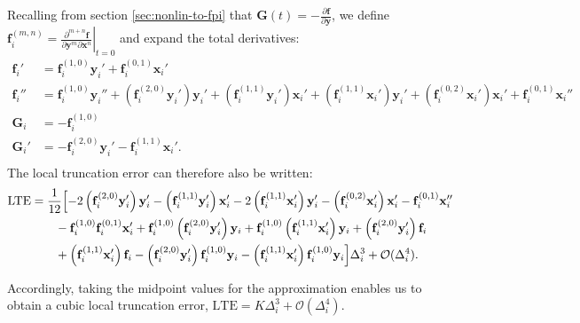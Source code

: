 Recalling from section \ref{sec:nonlin-to-fpi} that $\mathbf{G}(t) = -\frac{\partial \mathbf{f}}{\partial \mathbf{y}}$, we define $\mathbf{f}_i^{(m,n)} = \left.\frac{\partial ^{m+n}\mathbf{f}}{\partial \mathbf{y}^m \partial \mathbf{x}^n}\right|_{t=0}$ and expand the total derivatives:
\begin{equation}
\begin{split}
    \mathbf{f}_i' & = \mathbf{f}_i^{(1,0)}\mathbf{y}_i'+\mathbf{f}_i^{(0,1)}\mathbf{x}_i'\\
    \mathbf{f}_i'' & = \mathbf{f}_i^{(1,0)}\mathbf{y}_i'' + \left(\mathbf{f}_i^{(2,0)}\mathbf{y}_i'\right)\mathbf{y}_i'  + \left(\mathbf{f}_i^{(1,1)}\mathbf{y}_i'\right)\mathbf{x}_i' + \left(\mathbf{f}_i^{(1,1)}\mathbf{x}_i'\right)\mathbf{y}_i' + \left(\mathbf{f}_i^{(0,2)}\mathbf{x}_i'\right)\mathbf{x}_i' + \mathbf{f}_i^{(0,1)}\mathbf{x}_i''\\
    \mathbf{G}_i & = -\mathbf{f}_i^{(1,0)} \\
    \mathbf{G}_i' & =  - \mathbf{f}_i^{(2,0)}\mathbf{y}_i' - \mathbf{f}_i^{(1,1)}\mathbf{x}_i'.\\
\end{split}
\end{equation}
The local truncation error can therefore also be written:
\begin{equation}
\begin{split}
    \textrm{LTE} & = \frac{1}{12}\Bigl[-2\left(\mathbf{f}_i^{(2,0)}\mathbf{y}_i'\right)\mathbf{y}_i' - \left(\mathbf{f}_i^{(1,1)}\mathbf{y}_i'\right)\mathbf{x}_i' - 2\left(\mathbf{f}_i^{(1,1)}\mathbf{x}_i'\right)\mathbf{y}_i' - \left(\mathbf{f}_i^{(0,2)}\mathbf{x}_i'\right)\mathbf{x}_i' - \mathbf{f}_i^{(0,1)}\mathbf{x}_i'' \\ 
    & \qquad - \mathbf{f}_i^{(1,0)}\mathbf{f}_i^{(0,1)}\mathbf{x}_i' + \mathbf{f}_i^{(1,0)}\left(\mathbf{f}_i^{(2,0)}\mathbf{y}_i'\right)\mathbf{y}_i + \mathbf{f}_i^{(1,0)}\left(\mathbf{f}_i^{(1,1)}\mathbf{x}_i'\right)\mathbf{y}_i + \left(\mathbf{f}_i^{(2,0)}\mathbf{y}_i'\right)\mathbf{f}_i \\ 
    & \qquad  + \left(\mathbf{f}_i^{(1,1)}\mathbf{x}_i'\right)\mathbf{f}_i - \left(\mathbf{f}_i^{(2,0)}\mathbf{y}_i'\right)\mathbf{f}_i^{(1,0)}\mathbf{y}_i - \left(\mathbf{f}_i^{(1,1)}\mathbf{x}_i'\right)\mathbf{f}_i^{(1,0)}\mathbf{y}_i\Bigr]\Delta_i^3 + \mathcal{O}(\Delta_i^4). 
\end{split}
\end{equation} 

Accordingly, taking the midpoint values for the approximation enables us to obtain a cubic local truncation error, $\textrm{LTE} = K\Delta_i^3 + \mathcal{O}(\Delta_i^4)$. 

